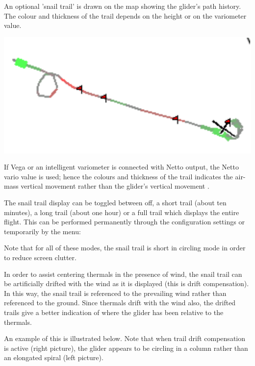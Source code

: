 \documentclass[a4paper,12pt]{refrep}
\begin{document}
An optional 'snail trail' is drawn on the map showing the glider's
path history.  The colour and thickness of the trail depends on the height or
on the variometer value.  

\begin{center}
\includegraphics[angle=0,width=0.8\linewidth,keepaspectratio='true']{figures/snail.pdf}
\end{center}

If Vega or an intelligent variometer is connected with Netto output,
the Netto vario value is used; hence the colours and thickness of the
trail indicates the air-mass vertical movement rather than the glider's
vertical movement	.

The snail trail display can be toggled between off, a short trail
(about ten minutes), a long trail (about one hour) or a full trail
which displays the entire flight.  This can be performed permanently
through the configuration  settings or temporarily by the
menu:
\begin{quote}
\blink{}\blink{}
\end{quote}

Note that for all of these modes, the snail trail is short in
circling mode in order to reduce screen clutter.

In order to assist centering thermals in the presence of wind, the
snail trail can be artificially drifted with the wind as it is
displayed (this is drift compensation).  In this way, the snail trail
is referenced to the prevailing wind rather than referenced to the
ground.  Since thermals drift with the wind also, the drifted trails
give a better indication of where the glider has been relative to the
thermals.

An example of this is illustrated below.  Note that when trail drift
compensation is active (right picture), the glider appears to be
circling in a column rather than an elongated spiral (left picture).
\end{document}
